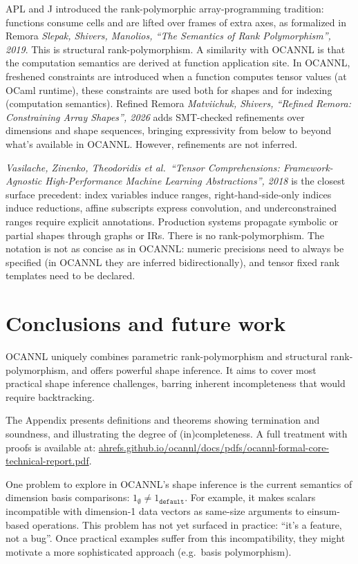 \documentclass[
  10pt,
  letterpaper,
]{article}
\begin{document}
APL and J introduced the rank-polymorphic array-programming tradition:
functions consume cells and are lifted over frames of extra axes, as
formalized in Remora \emph{Slepak, Shivers, Manolios, ``The Semantics of
Rank Polymorphism'', 2019}. This is structural rank-polymorphism. A
similarity with OCANNL is that the computation semantics are derived at
function application site. In OCANNL, freshened constraints are
introduced when a function computes tensor values (at OCaml runtime),
these constraints are used both for shapes and for indexing (computation
semantics). Refined Remora \emph{Matviichuk, Shivers, ``Refined Remora:
Constraining Array Shapes'', 2026} adds SMT-checked refinements over
dimensions and shape sequences, bringing expressivity from below to
beyond what's available in OCANNL. However, refinements are not
inferred.

\emph{Vasilache, Zinenko, Theodoridis et al.~``Tensor Comprehensions:
Framework-Agnostic High-Performance Machine Learning Abstractions'',
2018} is the closest surface precedent: index variables induce ranges,
right-hand-side-only indices induce reductions, affine subscripts
express convolution, and underconstrained ranges require explicit
annotations. Production systems propagate symbolic or partial shapes
through graphs or IRs. There is no rank-polymorphism. The notation is
not as concise as in OCANNL: numeric precisions need to always be
specified (in OCANNL they are inferred bidirectionally), and tensor
fixed rank templates need to be declared.

\section{Conclusions and future work}\label{conclusions-and-future-work}

OCANNL uniquely combines parametric rank-polymorphism and structural
rank-polymorphism, and offers powerful shape inference. It aims to cover
most practical shape inference challenges, barring inherent
incompleteness that would require backtracking.

The Appendix presents definitions and theorems showing termination and
soundness, and illustrating the degree of (in)completeness. A full
treatment with proofs is available at:
\href{https://ahrefs.github.io/ocannl/docs/pdfs/ocannl-formal-core-technical-report.pdf}{ahrefs.github.io/ocannl/docs/pdfs/ocannl-formal-core-technical-report.pdf}.

One problem to explore in OCANNL's shape inference is the current
semantics of dimension basis comparisons:
\(1_\emptyset \neq 1_\texttt{default}\). For example, it makes scalars
incompatible with dimension-1 data vectors as same-size arguments to
einsum-based operations. This problem has not yet surfaced in practice:
``it's a feature, not a bug''. Once practical examples suffer from this
incompatibility, they might motivate a more sophisticated approach
(e.g.~basis polymorphism).
\end{document}
